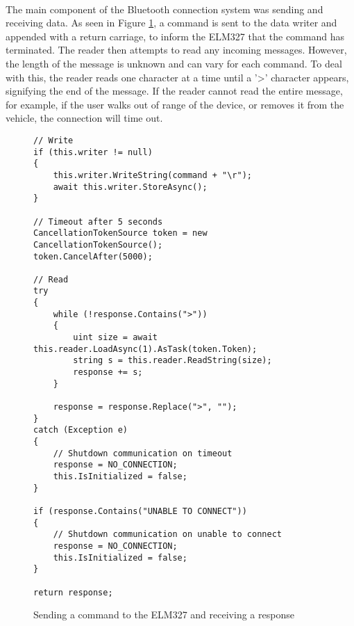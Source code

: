 		\paragraph{}{
		The main component of the Bluetooth connection system was sending and receiving data. As seen in Figure \ref{code:BTConnectionSend}, a command is sent to the data writer and appended with a return carriage, to inform the ELM327 that the command has terminated. The reader then attempts to read any incoming messages. However, the length of the  message is unknown and can vary for each command. To deal with this, the reader reads one character at a time until a '\textgreater' character appears, signifying the end of the message. If the reader cannot read the entire message, for example, if the user walks out of range of the device, or removes it from the vehicle, the connection will time out.
		}

		\begin{figure}[h]
			\begin{lstlisting}
// Write
if (this.writer != null)
{
    this.writer.WriteString(command + "\r");
	await this.writer.StoreAsync();
}

// Timeout after 5 seconds                
CancellationTokenSource token = new CancellationTokenSource();
token.CancelAfter(5000);

// Read
try
{
	while (!response.Contains(">"))
	{
		uint size = await this.reader.LoadAsync(1).AsTask(token.Token);                        
        string s = this.reader.ReadString(size);
		response += s;
	}
    
    response = response.Replace(">", "");
}
catch (Exception e)
{
	// Shutdown communication on timeout
	response = NO_CONNECTION;
	this.IsInitialized = false;
}                

if (response.Contains("UNABLE TO CONNECT"))
{
	// Shutdown communication on unable to connect
	response = NO_CONNECTION;
    this.IsInitialized = false;
}

return response;
			\end{lstlisting}
			\caption{Sending a command to the ELM327 and receiving a response}
			\label{code:BTConnectionSend}
		\end{figure}		
		
